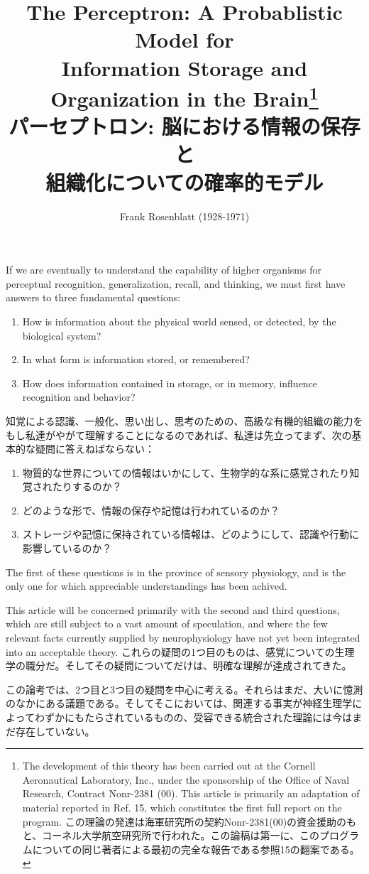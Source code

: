 \documentclass[uplatex,dvipdfmx]{jsarticle} \usepackage{amsmath,amssymb,bm}
\title{The Perceptron: A Probablistic Model for \\Information Storage and Organization in the Brain\footnote{
The development of this theory has been carried out at the Cornell Aeronautical Laboratory, Inc., under the sponsorship of the Office of Naval Research, Contract Nonr-2381 (00). This article is primarily an adaptation of material reported in Ref. 15, which constitutes the first full report on the program.
この理論の発達は海軍研究所の契約Nonr-2381(00)の資金援助のもと、コーネル大学航空研究所で行われた。この論稿は第一に、このプログラムについての同じ著者による最初の完全な報告である参照15の翻案である。
}
\\パーセプトロン: 脳における情報の保存と\\組織化についての確率的モデル} \author{Frank Rosenblatt (1928-1971)} \date{}
\begin{document}
\maketitle

\begin{paracol}{2}
\vspace{\baselineskip}
If we are eventually to understand the capability of higher organisms for perceptual recognition, generalization, recall, and thinking, we must first have answers to three fundamental questions:
\begin{enumerate}
\item How is information about the physical world sensed, or detected, by the biological system?
\item In what form is information stored, or remembered?
\item How does information contained in storage, or in memory, influence recognition and behavior?
\end{enumerate}
\switchcolumn
\vspace{\baselineskip}
知覚による認識、一般化、思い出し、思考のための、高級な有機的組織の能力をもし私達がやがて理解することになるのであれば、私達は先立ってまず、次の基本的な疑問に答えねばならない：
\begin{enumerate}
\item 物質的な世界についての情報はいかにして、生物学的な系に感覚されたり知覚されたりするのか？
\item どのような形で、情報の保存や記憶は行われているのか？
\item ストレージや記憶に保持されている情報は、どのようにして、認識や行動に影響しているのか？
 \end{enumerate}
\end{paracol}
\begin{paracol}{2}
The first of these questions is in the province of sensory physiology, and is the only one for which appreciable understandings has been achived.

This article will be concerned primarily with the second and third questions, which are still subject to a vast amount of speculation, and where the few relevant facts currently supplied by neurophysiology have not yet been integrated into an acceptable theory.
\switchcolumn
これらの疑問の1つ目のものは、感覚についての生理学の職分だ。そしてその疑問についてだけは、明確な理解が達成されてきた。

この論考では、2つ目と3つ目の疑問を中心に考える。それらはまだ、大いに憶測のなかにある議題である。そしてそこにおいては、関連する事実が神経生理学によってわずかにもたらされているものの、受容できる統合された理論には今はまだ存在していない。
\end{paracol}
\end{document}
